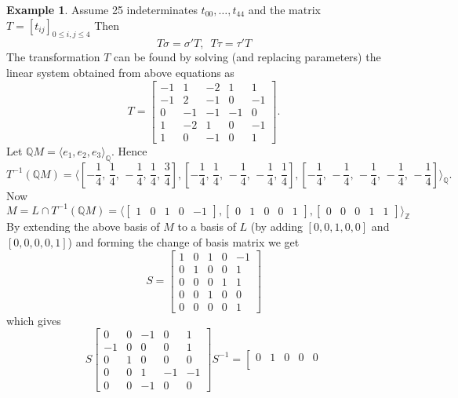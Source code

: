 \documentclass[12pt]{article}
\theoremstyle{plain}
\theoremstyle{definition}
\newtheorem{example}[theorem]{Example}
\newcommand{\Z}{\ensuremath{\mathbb{Z}}}
\newcommand{\Q}{\ensuremath{\mathbb{Q}}}
\begin{document}
\begin{example}
Assume 25 indeterminates $t_{00}  ,\ldots , t_{44}$ and the matrix $T=\left[t_{ij}\right]_{0 \leq i,j \leq 4}$
Then 
$$
T\sigma= \sigma' T
, \,\,\,
T\tau= \tau' T
$$
The transformation $T$ can be found by solving (and replacing parameters) the linear system obtained from above equations as
$$
T =\left[\begin{array}{rrrrr}
-1 & 1 & -2 & 1 & 1 \\
-1 & 2 & -1 & 0 & -1 \\
0 & -1 & -1 & -1 & 0 \\
1 & -2 & 1 & 0 & -1 \\
1 & 0 & -1 & 0 & 1
\end{array}\right].
$$
Let $\Q M = \langle e_1, e_2 , e_3 \rangle_\Q$.
Hence $$T^{-1}(\Q M) = \langle   \left[-\frac{1}{4},\,\frac{1}{4},\,-\frac{1}{4},\,\frac{1}{4},\,\frac{3}{4}\right], \left[-\frac{1}{4},\,\frac{1}{4},\,-\frac{1}{4},\,-\frac{1}{4},\,\frac{1}{4}\right],  \left[-\frac{1}{4},\,-\frac{1}{4},\,-\frac{1}{4},\,-\frac{1}{4},\,-\frac{1}{4}\right]\rangle_\Q .$$
Now
$$M = L \cap T^{-1}(\Q M) = \langle \left[\begin{array}{ccccc}1&0&1&0&-1\end{array}\right], \left[\begin{array}{rrrrr}
0 & 1 & 0 & 0 & 1
\end{array}\right], \left[\begin{array}{rrrrr}
0 & 0 & 0 & 1 & 1
\end{array}\right] \rangle_\Z$$ 
By extending the above basis of $M$ to a basis of $L$ (by adding $[0,0,1,0,0]$ and $[0,0,0,0,1]$) and forming the change of basis matrix we get 
$$
S =  \left[\begin{array}{rrrrr}
1 & 0 & 1 & 0 & -1 \\
0 & 1 & 0 & 0 & 1 \\
0 & 0 & 0 & 1 & 1 \\
0 & 0 & 1 & 0 & 0 \\
0 & 0 & 0 & 0 & 1
\end{array}\right]
$$
 which gives 
$$
 S
\left[\begin{array}{rrrrr}
0 & 0 & -1 & 0 & 1 \\
-1 & 0 & 0 & 0 & 1 \\
0 & 1 & 0 & 0 & 0 \\
0 & 0 & 1 & -1 & -1 \\
0 & 0 & -1 & 0 & 0
\end{array}\right]
S^{-1}
= 
\left[\begin{array}{rrr|rr}
0 & 1 & 0 & 0 & 0 \\

\end{array}$$
\end{example}
\end{document}
